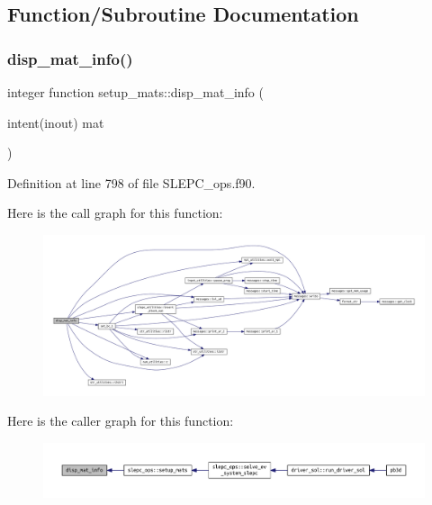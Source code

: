 \subsection{Function/\+Subroutine Documentation}
\mbox{\label{SLEPC__ops_8f90_a1d58436fdcad8037090c9ce1e50a9ae1}} 
\subsubsection{\texorpdfstring{disp\+\_\+mat\+\_\+info()}{disp\_mat\_info()}}
{\footnotesize\ttfamily integer function setup\+\_\+mats\+::disp\+\_\+mat\+\_\+info (\begin{DoxyParamCaption}\item[{intent(inout)}]{mat }\end{DoxyParamCaption})}



Definition at line 798 of file S\+L\+E\+P\+C\+\_\+ops.\+f90.

Here is the call graph for this function\+:
\nopagebreak
\begin{figure}[H]
\begin{center}
\leavevmode
\includegraphics[width=350pt]{SLEPC__ops_8f90_a1d58436fdcad8037090c9ce1e50a9ae1_cgraph}
\end{center}
\end{figure}
Here is the caller graph for this function\+:
\nopagebreak
\begin{figure}[H]
\begin{center}
\leavevmode
\includegraphics[width=350pt]{SLEPC__ops_8f90_a1d58436fdcad8037090c9ce1e50a9ae1_icgraph}
\end{center}
\end{figure}
\mbox{\label{SLEPC__ops_8f90_a2304e2ffd00378a9252c04507d5a1a7e}} 

